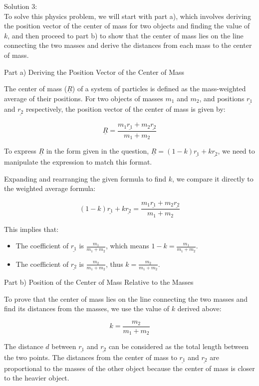 \documentclass[a4paper,11pt]{article}
\begin{document}
\noindent Solution 3: \\

To solve this physics problem, we will start with part a), which involves deriving the position vector of the center of mass for two objects and finding the value of \( k \), and then proceed to part b) to show that the center of mass lies on the line connecting the two masses and derive the distances from each mass to the center of mass.

Part a) Deriving the Position Vector of the Center of Mass

The center of mass (\( \underline{R} \)) of a system of particles is defined as the mass-weighted average of their positions. For two objects of masses \( m_{1} \) and \( m_{2} \), and positions \( \underline{r_{1}} \) and \( \underline{r_{2}} \) respectively, the position vector of the center of mass is given by:

\[ \underline{R} = \frac{m_{1}\underline{r_{1}} + m_{2}\underline{r_{2}}}{m_{1} + m_{2}} \]

To express \( \underline{R} \) in the form given in the question, \( \underline{R} = (1-k)\underline{r_{1}} + k\underline{r_{2}} \), we need to manipulate the expression to match this format.

Expanding and rearranging the given formula to find \( k \), we compare it directly to the weighted average formula:

\[ (1-k)\underline{r_{1}} + k\underline{r_{2}} = \frac{m_{1}\underline{r_{1}} + m_{2}\underline{r_{2}}}{m_{1} + m_{2}} \]

This implies that:

\begin{itemize}
    \item The coefficient of \( \underline{r_{1}} \) is \( \frac{m_{1}}{m_{1} + m_{2}} \), which means \( 1-k = \frac{m_{1}}{m_{1} + m_{2}} \).
    \item The coefficient of \( \underline{r_{2}} \) is \( \frac{m_{2}}{m_{1} + m_{2}} \), thus \( k = \frac{m_{2}}{m_{1} + m_{2}} \).
\end{itemize}

Part b) Position of the Center of Mass Relative to the Masses

To prove that the center of mass lies on the line connecting the two masses and find its distances from the masses, we use the value of \( k \) derived above:

\[ k = \frac{m_{2}}{m_{1} + m_{2}} \]

The distance \( d \) between \( \underline{r_{1}} \) and \( \underline{r_{2}} \) can be considered as the total length between the two points. The distances from the center of mass to \( \underline{r_{1}} \) and \( \underline{r_{2}} \) are proportional to the masses of the other object because the center of mass is closer to the heavier object.
\end{document}
